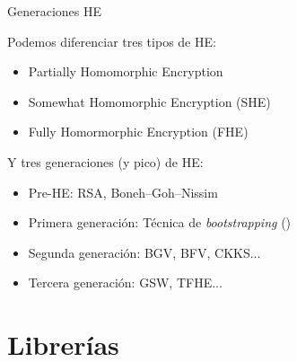 \documentclass{beamer}
\begin{document}
\begin{frame}{Generaciones HE}
    
    Podemos diferenciar tres tipos de HE:
    
    \begin{itemize}
        \item Partially Homomorphic Encryption
        \item Somewhat Homomorphic Encryption (SHE)
        \item Fully Homormorphic Encryption (FHE)
    \end{itemize}
    
    Y tres generaciones (y pico) de HE:
    
    \begin{itemize}
        \item Pre-HE: RSA, Boneh–Goh–Nissim
        \item Primera generación: Técnica de \textit{bootstrapping} (\cite{gentry_fully_2009})
        \item Segunda generación: BGV, BFV, CKKS...
        \item Tercera generación: GSW, TFHE...
    \end{itemize}
 
\end{frame}

\section{Librerías}
\end{document}
